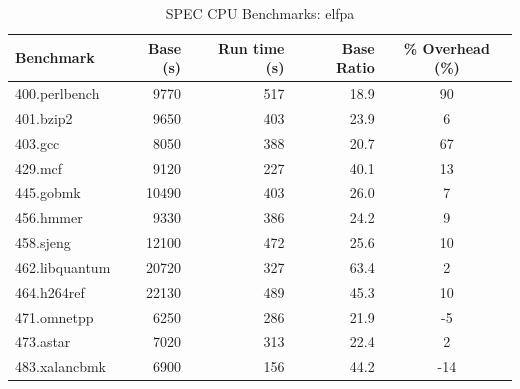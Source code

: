 \documentclass[12pt]{cslreport}
\begin{document}
\begin{table}
\begin{center}
\begin{tabular}{|l|r|r|r|c|}
\hline
Benchmark  & Base  (s)  & Run time (s) &  Base Ratio & \% Overhead (\%)\\
\hline
400.perlbench    & 9770        & 517       & 18.9 & 90 \\
401.bzip2        & 9650        & 403       & 23.9 & 6  \\
403.gcc          & 8050        & 388       & 20.7 & 67 \\
429.mcf          & 9120        & 227       & 40.1 & 13 \\
445.gobmk      &  10490        & 403       & 26.0 & 7  \\
456.hmmer        & 9330        & 386       & 24.2 & 9  \\
458.sjeng       & 12100        & 472       & 25.6 & 10 \\
462.libquantum  & 20720        & 327       & 63.4 & 2  \\
464.h264ref     & 22130        & 489       & 45.3 & 10 \\
471.omnetpp      & 6250        & 286       & 21.9 & -5 \\
473.astar        & 7020        & 313       & 22.4 & 2  \\
483.xalancbmk    & 6900        & 156       & 44.2 & -14 \\
\hline
\end{tabular}
\end{center}
\caption{SPEC CPU Benchmarks: elfpa}
\label{elfpa:spec}
\end{table}

\end{document}
